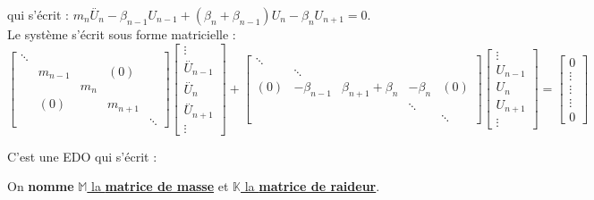\documentclass[12pt,a4paper]{article}
\begin{document}
	qui s'écrit : $m_n \overset{\textbf{..}}{U}_n - \beta_{n-1}U_{n-1} + (\beta_n+\beta_{n-1})U_n - \beta_nU_{n+1} = 0$.\\
	Le système s'écrit sous forme matricielle :
	\[\left[\begin{matrix}
		\ddots & & & & \\
		& m_{n-1} & & (0) & \\
		& & m_n & & \\
		&(0) & & m_{n+1} & \\
		& & & & \ddots
	\end{matrix}\right]\left[\begin{matrix}
		\vdots\\
		\overset{\textbf{..}}{U}_{n-1}\\
		\overset{\textbf{..}}{U}_{n}\\
		\overset{\textbf{..}}{U}_{n+1}\\
		\vdots
	\end{matrix}\right] + \left[\begin{matrix}
		\ddots & & & & \\
		& \ddots & & & \\
		(0) & - \beta_{n-1} & \beta_{n+1}+\beta_n & -\beta_n & (0)\\
		& & & \ddots & \\
		& & & & \ddots
	\end{matrix}\right]\left[\begin{matrix}
		\vdots\\
		U_{n-1}\\
		U_n\\
		U_{n+1}\\
		\vdots
	\end{matrix}\right] = \left[\begin{matrix}
		0 \\
		\vdots \\
		\vdots \\
		\vdots \\
		0
	\end{matrix}\right]\]
	
	C'est une EDO qui s'écrit : 
	\begin{center}
		\begin{minipage}{4cm}
		\end{minipage}
	\end{center}
	
	On \textbf{nomme} \underline{$\mathbb{M}$ la \textbf{matrice de masse}} et \underline{$\mathbb{K}$ la \textbf{matrice de raideur}}.
	
\end{document}
